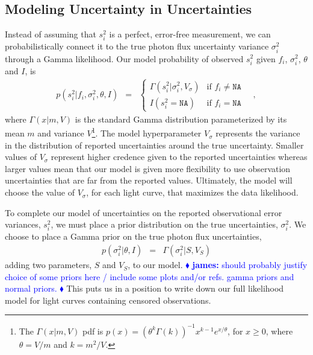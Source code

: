 \documentclass[12pt,preprint]{aastex}
\newcommand{\fobs}{f_i}
\newcommand{\sobs}{s^2_i}
\newcommand{\james}[1] { \textcolor{blue} {
\ensuremath{\blacklozenge} {\bf james:}  {#1}
\ensuremath{\blacklozenge} } }
\begin{document}
\subsection{Modeling Uncertainty in Uncertainties}
\label{sec:uncertainty}
Instead of assuming that $\sobs$ is a perfect, error-free measurement, we can probabilistically connect it to the true photon flux uncertainty variance $\sigma^2_i$ through a Gamma likelihood.  Our model probability of observed $\sobs$ given $\fobs$, $\sigma^2_i$, $\theta$ and $I$, is
\begin{eqnarray}\displaystyle
p(\sobs | \fobs, \sigma^2_i, \theta,I) &=& \left\{\begin{array}{ll}
  \Gamma (\sobs | \sigma^2_i, V_{\sigma} ) & \mbox{if $\fobs \ne \texttt{NA}$} \\
 I(\sobs = \texttt{NA})& \mbox{if $\fobs = \texttt{NA}$}
\end{array}\right.\label{eq:slik}
\quad ,
\end{eqnarray}
where $\Gamma(x | m, V)$ is the standard Gamma distribution parameterized by its mean $m$ and variance $V$\footnote{The $\Gamma(x | m, V)$ pdf is $ p(x ) = (\theta^k \Gamma(k))^{-1}  x^{k-1} e^{x/ \theta}$, for $x \ge 0$, where $\theta = V / m$ and $k  = m^2 / V$.}.
The  model hyperparameter $V_\sigma$ represents the
variance in the distribution of reported uncertainties around the true
uncertainty.  Smaller values of $V_\sigma$ represent higher credence given to the reported uncertainties whereas larger values mean that our model is given more flexibility to use observation uncertainties that are far from the reported values.  Ultimately, the model will choose the value of $V_\sigma$, for each light curve, that maximizes the data likelihood.

To complete our model of uncertainties on the reported observational error variances, $s_i^2$, we must place a prior distribution on the true uncertainties, $\sigma_i^2$.  We choose to place a Gamma prior on the true photon flux uncertainties, 
\begin{eqnarray}\displaystyle
p(\sigma^2_i|\theta, I) &=& \Gamma(\sigma^2_i | S, V_S)
\label{eq:sigma_prior}
\end{eqnarray}
adding two parameters, $S$ and $V_S$, to our model.
\james{should probably justify choice of some priors here / include some plots and/or refs. gamma priors and normal priors.}  This puts us in a position to write down our full likelihood model for light curves containing censored observations.
\end{document}
